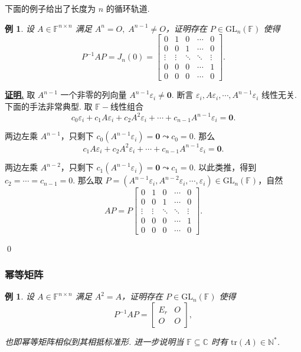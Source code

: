 \documentclass[10pt,openany]{article}
\theoremstyle{thmstyle} %
\theoremstyle{defstyle} %
\theoremstyle{prostyle} %
\theoremstyle{exastyle}
\newtheorem{example}[theorem]{例}
\theoremstyle{remstyle}
\renewenvironment{proof}[1][证明]{\par\underline{\textbf{#1.}} \;\fangsong}{\qed\par}
\newcommand{\F}{\mathbb{F}}
\newcommand{\gfn}{\text{GL}_n(\mathbb{F})}
\newcommand{\C}{\mathbb{C}}
\newcommand{\n}{^{n \times n}}
\newcommand{\tr}{\mathrm{tr}}
\begin{document}
下面的例子给出了长度为 \( n \) 的循环轨道.

\begin{example}
	设 \( A \in \F\n \) 满足 \( A^n=O, \; A^{n-1} \neq O \)，证明存在 \( P \in \gfn \) 使得 
	\[ P^{-1}AP=J_n(0)=\begin{bmatrix}
		0 & 1 & 0 & \cdots & 0 \\
		0 & 0 & 1 & \cdots & 0 \\
		\vdots & \vdots & \ddots & \ddots & \vdots \\
		0 & 0 & 0 & \cdots & 1 \\
		0 & 0 & 0 & \cdots & 0
	\end{bmatrix}. \]
\end{example}

\begin{proof}
	取 \( A^{n-1} \) 一个非零的列向量 \( A^{n-1}\varepsilon_i \neq \bm{0} \). 断言 \( \varepsilon_i, A\varepsilon_i,\cdots,A^{n-1}\varepsilon_i \) 线性无关. 下面的手法非常典型. 取 \( \F-\)线性组合
	\[ c_0\varepsilon_i+c_1A\varepsilon_i+c_2A^2\varepsilon_i+\cdots+c_{n-1}A^{n-1}\varepsilon_i=\bm{0}. \]
	
	两边左乘 \( A^{n-1} \)，只剩下 \( c_0(A^{n-1}\varepsilon_i)=\bm{0} \leadsto c_0=0 \). 那么
	\[ c_1A\varepsilon_i+c_2A^2\varepsilon_i+\cdots+c_{n-1}A^{n-1}\varepsilon_i=\bm{0}. \]
	
	两边左乘 \( A^{n-2} \)，只剩下 \( c_1(A^{n-1}\varepsilon_i)=\bm{0} \leadsto c_1=0 \). 以此类推，得到 \( c_2=\cdots=c_{n-1}=0 \). 那么取 \( P=(A^{n-1}\varepsilon_i, A^{n-2}\varepsilon_i,\cdots,\varepsilon_i) \in \gfn \)，自然
	\[ AP=P\begin{bmatrix}
		0 & 1 & 0 & \cdots & 0 \\
		0 & 0 & 1 & \cdots & 0 \\
		\vdots & \vdots & \ddots & \ddots & \vdots \\
		0 & 0 & 0 & \cdots & 1 \\
		0 & 0 & 0 & \cdots & 0
	\end{bmatrix}. \]
	
\end{proof}


\subsubsection{幂等矩阵}

\begin{example} \label{3.4.11}
	设 \( A \in \F\n \) 满足 \( A^2=A \)，证明存在 \( P \in \gfn \) 使得
	\[ P^{-1}AP=\begin{bmatrix}
		E_r & O \\
		O & O
	\end{bmatrix}, \]
	
	也即幂等矩阵相似到其相抵标准形. 进一步说明当 \( \F \subseteq \C \) 时有 \( \tr(A) \in \mathbb{N}^* \).
\end{example}
\end{document}
